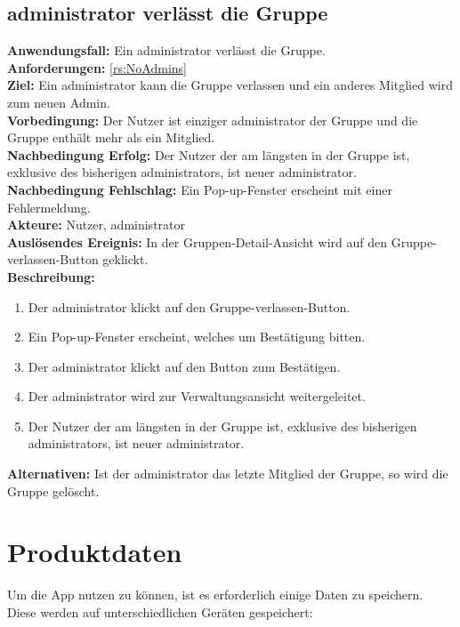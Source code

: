 \documentclass[parskip=full]{scrartcl}
\newcommand{\changelocaltocdepth}[1]{%
  \addtocontents{toc}{\protect\setcounter{tocdepth}{#1}}%
  \setcounter{tocdepth}{#1}%
}
\newcommand{\enablesubsectionnumbering}[1]{
    \renewcommand{\thesubsection}{$\langle$#1\arabic{subsection}0$\rangle$}
    \changelocaltocdepth{1} 
}
\newcommand{\resetsubsectionnumbering}{
    \renewcommand{\thesubsection}{\arabic{section}.\arabic{subsection}}
    \changelocaltocdepth{3} 
}
\begin{document}
\subsection{\Gls{administrator} verlässt die Gruppe}
\textbf{Anwendungsfall:} Ein \Gls{administrator} verlässt die Gruppe.\\
\textbf{Anforderungen:} \ref{rs:NoAdmins}\\
\textbf{Ziel:} Ein \Gls{administrator} kann die Gruppe verlassen und ein anderes Mitglied wird zum neuen Admin.\\
\textbf{Vorbedingung:} Der Nutzer ist einziger \Gls{administrator} der Gruppe und die Gruppe enthält mehr als ein Mitglied.\\
\textbf{Nachbedingung Erfolg:} Der Nutzer der am längsten in der Gruppe ist, exklusive des bisherigen \Gls{administrator}s, ist neuer \Gls{administrator}.\\
\textbf{Nachbedingung Fehlschlag:} Ein Pop-up-Fenster erscheint mit einer Fehlermeldung.\\
\textbf{Akteure:} Nutzer, \Gls{administrator}\\
\textbf{Auslösendes Ereignis:} In der Gruppen-Detail-Ansicht wird auf den Gruppe-verlassen-Button geklickt.\\
\textbf{Beschreibung:}
\begin{enumerate}
    \item Der \Gls{administrator} klickt auf den Gruppe-verlassen-Button.
    \item Ein Pop-up-Fenster erscheint, welches um Bestätigung bitten.
    \item Der \Gls{administrator} klickt auf den Button zum Bestätigen.
    \item Der \Gls{administrator} wird zur Verwaltungsansicht weitergeleitet.
    \item Der Nutzer der am längsten in der Gruppe ist, exklusive des bisherigen \Gls{administrator}s, ist neuer \Gls{administrator}. 
\end{enumerate}
\textbf{Alternativen:} Ist der \Gls{administrator} das letzte Mitglied der Gruppe, so wird die Gruppe gelöscht.
\newpage


\resetsubsectionnumbering


\section{Produktdaten}
\enablesubsectionnumbering{D}
Um die App nutzen zu können, ist es erforderlich einige Daten zu speichern. Diese werden auf unterschiedlichen Geräten gespeichert:
\end{document}
